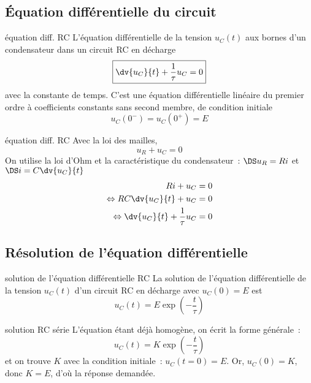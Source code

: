 \documentclass[../main/main.tex]{subfiles}
\begin{document}
\subsection{Équation différentielle du circuit}
\begin{tcbraster}[raster columns=2, raster equal height=rows]
    \begin{prop}[label=prop:eqdiffrc]{équation diff. RC}
        L'équation différentielle de la tension $u_C(t)$ aux bornes d'un
        condensateur dans un circuit RC en décharge
        \[ \boxed{\dv{u_C}{t} + \frac{1}{\tau}u_C = 0}\]
        avec  la constante de temps.
        \tcblower
        C'est une équation différentielle linéaire du premier ordre à
        coefficients constants sans second membre, de condition initiale
        \[ \boxed{u_C(0^-) = u_C(0^+) = E}\]
    \end{prop}
    \begin{demo}[label=demo:eqdiffrc]{équation diff. RC}
        Avec la loi des mailles,
        $$u_R + u_C = 0$$
        On utilise la loi d'Ohm et la caractéristique du condensateur~:
        $\DS u_R = Ri$ et $\DS i = C \dv{u_C}{t}$
        \begin{align*}
            Ri + u_C                                        & = 0\\
            \Leftrightarrow RC \dv{u_C}{t} + u_C            & = 0\\
            \Leftrightarrow \dv{u_C}{t} + \frac{1}{\tau}u_C & = 0
        \end{align*}
    \end{demo}
\end{tcbraster}

\subsection{Résolution de l'équation différentielle}
\begin{tcbraster}[raster columns=2, raster equal height=rows]
    \begin{prop}[label=prop:ucsolu]{solution de l'équation
        différentielle RC}
        La solution de l'équation différentielle de la tension $u_C(t)$
        d'un circuit RC en décharge avec $u_C(0) = E$ est
        \[\boxed{u_C(t) = E\exp\left(-\frac{t}{\tau}\right)}\]
    \end{prop}
    \begin{demo}[label=demo:rcsolu]{solution RC série}
        L'équation étant déjà homogène, on écrit la forme générale~:
        \[u_C(t) = K\exp\left( -\frac{t}{\tau} \right)\]
        et on trouve $K$ avec la condition initiale~: $u_C(t=0) = E$. Or,
        $u_C(0) = K$, donc $K=E$, d'où la réponse demandée.
    \end{demo}
\end{tcbraster}
\end{document}
